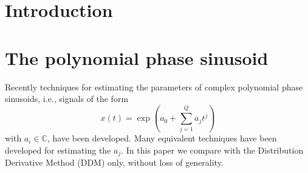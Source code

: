 \documentclass[twoside,a4paper]{article}
\title{\papertitle}
\newif\ifpdf
\begin{document}
\ifpdf %
  \DeclareGraphicsExtensions{.png,.jpg,.pdf}
\else  %
\fi

\maketitle

\begin{abstract}
TODO
\end{abstract}

\section{Introduction}
\label{sec:intro}
%
%
%
\section{The polynomial phase sinusoid}
Recently techniques for estimating the parameters of complex polynomial phase sinusoids,
i.e., signals of the form
\begin{equation}
    \label{eq:polyphaseexp}
    x(t) = \exp(a_0 + \sum_{j=1}^{Q} a_j t^j)
\end{equation}
with $a_{i} \in \mathbb{C}$, have been developed. Many equivalent techniques have
been developed for estimating the $a_j$. In this paper we compare with the
Distribution Derivative Method (DDM) only, without loss of generality.
\end{document}
